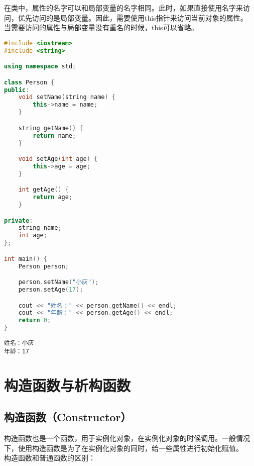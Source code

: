 在类中，属性的名字可以和局部变量的名字相同。此时，如果直接使用名字来访问，优先访问的是局部变量。因此，需要使用this指针来访问当前对象的属性。\\

当需要访问的属性与局部变量没有重名的时候，this可以省略。\\


\begin{lstlisting}[language=C++]
#include <iostream>
#include <string>

using namespace std;

class Person {
public:
    void setName(string name) {
        this->name = name;
    }

    string getName() {
        return name;
    }

    void setAge(int age) {
        this->age = age;
    }

    int getAge() {
        return age;
    }

private:
    string name;
    int age;
};

int main() {
    Person person;

    person.setName("小灰");
    person.setAge(17);

    cout << "姓名：" << person.getName() << endl;
    cout << "年龄：" << person.getAge() << endl;
    return 0;
}
\end{lstlisting}

\begin{tcolorbox}
	\begin{verbatim}
姓名：小灰
年龄：17
	\end{verbatim}
\end{tcolorbox}

\newpage

\section{构造函数与析构函数}

\subsection{构造函数（Constructor）}

构造函数也是一个函数，用于实例化对象，在实例化对象的时候调用。一般情况下，使用构造函数是为了在实例化对象的同时，给一些属性进行初始化赋值。\\

构造函数和普通函数的区别：

